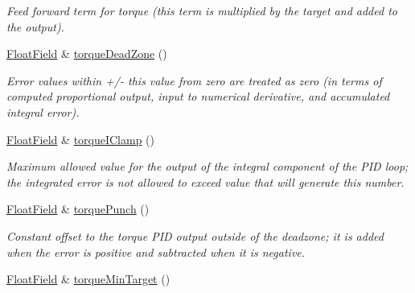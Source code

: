 \begin{DoxyCompactItemize}
\begin{DoxyCompactList}\small\item\em Feed forward term for torque (this term is multiplied by the target and added to the output). \end{DoxyCompactList}\item 
\hyperlink{classhebi_1_1Command_1_1FloatField}{Float\+Field} \& \hyperlink{classhebi_1_1Command_1_1Settings_1_1Actuator_1_1TorqueGains_af6a046c9f2382ecd14a175bda59e6dae}{torque\+Dead\+Zone} ()\hypertarget{classhebi_1_1Command_1_1Settings_1_1Actuator_1_1TorqueGains_af6a046c9f2382ecd14a175bda59e6dae}{}\label{classhebi_1_1Command_1_1Settings_1_1Actuator_1_1TorqueGains_af6a046c9f2382ecd14a175bda59e6dae}

\begin{DoxyCompactList}\small\item\em Error values within +/-\/ this value from zero are treated as zero (in terms of computed proportional output, input to numerical derivative, and accumulated integral error). \end{DoxyCompactList}\item 
\hyperlink{classhebi_1_1Command_1_1FloatField}{Float\+Field} \& \hyperlink{classhebi_1_1Command_1_1Settings_1_1Actuator_1_1TorqueGains_ab9988770fc6d3d5132d6ee91671868a5}{torque\+I\+Clamp} ()\hypertarget{classhebi_1_1Command_1_1Settings_1_1Actuator_1_1TorqueGains_ab9988770fc6d3d5132d6ee91671868a5}{}\label{classhebi_1_1Command_1_1Settings_1_1Actuator_1_1TorqueGains_ab9988770fc6d3d5132d6ee91671868a5}

\begin{DoxyCompactList}\small\item\em Maximum allowed value for the output of the integral component of the P\+ID loop; the integrated error is not allowed to exceed value that will generate this number. \end{DoxyCompactList}\item 
\hyperlink{classhebi_1_1Command_1_1FloatField}{Float\+Field} \& \hyperlink{classhebi_1_1Command_1_1Settings_1_1Actuator_1_1TorqueGains_a0a2c421d618aef63622cab0fc46d27e7}{torque\+Punch} ()\hypertarget{classhebi_1_1Command_1_1Settings_1_1Actuator_1_1TorqueGains_a0a2c421d618aef63622cab0fc46d27e7}{}\label{classhebi_1_1Command_1_1Settings_1_1Actuator_1_1TorqueGains_a0a2c421d618aef63622cab0fc46d27e7}

\begin{DoxyCompactList}\small\item\em Constant offset to the torque P\+ID output outside of the deadzone; it is added when the error is positive and subtracted when it is negative. \end{DoxyCompactList}\item 
\hyperlink{classhebi_1_1Command_1_1FloatField}{Float\+Field} \& \hyperlink{classhebi_1_1Command_1_1Settings_1_1Actuator_1_1TorqueGains_a3de5880860ddd81711b241d62efa76f4}{torque\+Min\+Target} ()\hypertarget{classhebi_1_1Command_1_1Settings_1_1Actuator_1_1TorqueGains_a3de5880860ddd81711b241d62efa76f4}{}\label{classhebi_1_1Command_1_1Settings_1_1Actuator_1_1TorqueGains_a3de5880860ddd81711b241d62efa76f4}


\end{DoxyCompactItemize}
